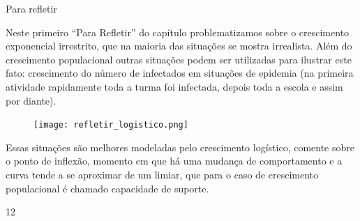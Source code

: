 \clearmargin
\begin{sugestions}{Para refletir}
{
	Neste primeiro ``Para Refletir'' do capítulo problematizamos sobre o crescimento exponencial irrestrito, que na maioria das situações se mostra irrealista. Além do crescimento populacional outras situações podem ser utilizadas para ilustrar este fato: crescimento do número de infectados em situações de epidemia (na primeira atividade rapidamente toda a turma foi infectada, depois toda a escola e assim por diante).
	\begin{figure}[H]
	\centering
	\texttt{[image: refletir\_logistico.png]}
	\end{figure}
	Essas situações são melhores modeladas pelo crescimento logístico, comente sobre o ponto de inflexão, momento em que há uma mudança de comportamento e a curva tende a se aproximar de um limiar, que para o caso de crescimento populacional é chamado capacidade de suporte.
}{1}{2}
\end{sugestions}


